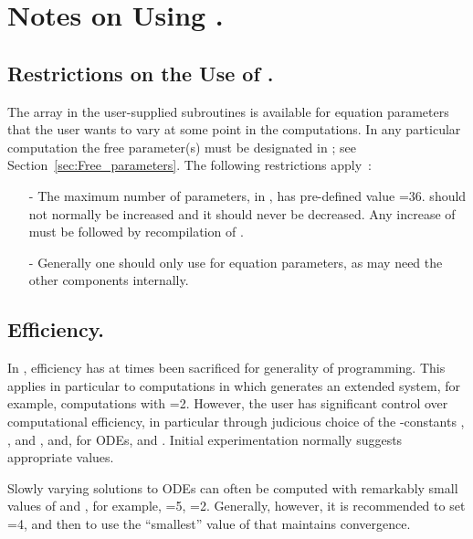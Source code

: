 \chapter{ Notes on Using \AUTO.}  \label{ch:Notes_on_Using_AUTO}
\section{ Restrictions on the Use of .} \label{sec:Restrictions_on_PAR}
The array  in the user-supplied subroutines is available
for equation parameters that the user wants to vary at some point
in the computations.
In any particular computation the free parameter(s) must be designated
in ; see Section~\ref{sec:Free_parameters}.
The following restrictions apply~:

\begin{itemize}
\item[-]
  The maximum number of parameters,  in ,
  has pre-defined value =36.   should not normally be increased
  and it should never be decreased.
  Any increase of  must be followed by recompilation of \AUTO.
\item[-]
  Generally one should only use  for equation parameters,
  as \AUTO may need the other components internally.  
\end{itemize}

\section{ Efficiency.} \label{sec:Efficiency}
In \AUTO, efficiency has at times been sacrificed for generality of programming.
This applies in particular to computations in which \AUTO generates
an extended system, for example, computations with =2.
However, the user has significant control over computational efficiency,
in particular through judicious choice of the \AUTO-constants  
, , and , and, for ODEs,  and .
Initial experimentation normally suggests appropriate values.

Slowly varying solutions to ODEs can often 
be computed with remarkably small values of  and , 
for example, =5,  =2.
Generally, however, it is recommended to set =4,
and then to use the ``smallest'' value of  that maintains convergence.

